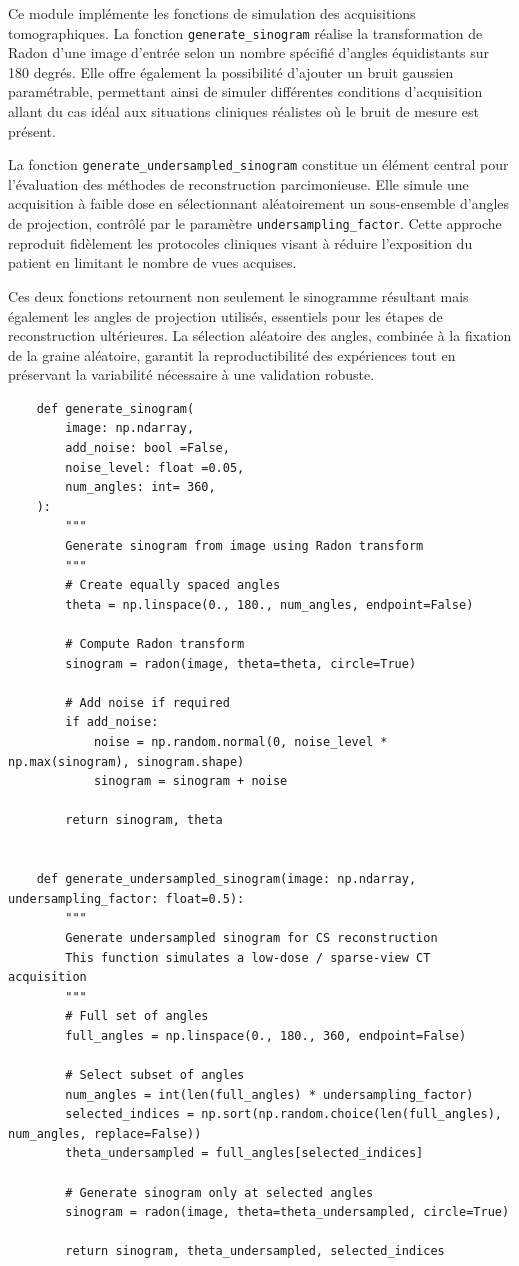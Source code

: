Ce module implémente les fonctions de simulation des acquisitions tomographiques. La fonction \texttt{generate\_sinogram} réalise la transformation de Radon d'une image d'entrée selon un nombre spécifié d'angles équidistants sur 180 degrés. Elle offre également la possibilité d'ajouter un bruit gaussien paramétrable, permettant ainsi de simuler différentes conditions d'acquisition allant du cas idéal aux situations cliniques réalistes où le bruit de mesure est présent.

La fonction \texttt{generate\_undersampled\_sinogram} constitue un élément central pour l'évaluation des méthodes de reconstruction parcimonieuse. Elle simule une acquisition à faible dose en sélectionnant aléatoirement un sous-ensemble d'angles de projection, contrôlé par le paramètre \texttt{undersampling\_factor}. Cette approche reproduit fidèlement les protocoles cliniques visant à réduire l'exposition du patient en limitant le nombre de vues acquises.

Ces deux fonctions retournent non seulement le sinogramme résultant mais également les angles de projection utilisés, essentiels pour les étapes de reconstruction ultérieures. La sélection aléatoire des angles, combinée à la fixation de la graine aléatoire, garantit la reproductibilité des expériences tout en préservant la variabilité nécessaire à une validation robuste.

\begin{verbatim}
    def generate_sinogram(
        image: np.ndarray,
        add_noise: bool =False,
        noise_level: float =0.05,
        num_angles: int= 360,
    ):
        """
        Generate sinogram from image using Radon transform
        """
        # Create equally spaced angles
        theta = np.linspace(0., 180., num_angles, endpoint=False)

        # Compute Radon transform
        sinogram = radon(image, theta=theta, circle=True)

        # Add noise if required
        if add_noise:
            noise = np.random.normal(0, noise_level * np.max(sinogram), sinogram.shape)
            sinogram = sinogram + noise

        return sinogram, theta


    def generate_undersampled_sinogram(image: np.ndarray, undersampling_factor: float=0.5):
        """
        Generate undersampled sinogram for CS reconstruction
        This function simulates a low-dose / sparse-view CT acquisition
        """
        # Full set of angles
        full_angles = np.linspace(0., 180., 360, endpoint=False)

        # Select subset of angles
        num_angles = int(len(full_angles) * undersampling_factor)
        selected_indices = np.sort(np.random.choice(len(full_angles), num_angles, replace=False))
        theta_undersampled = full_angles[selected_indices]

        # Generate sinogram only at selected angles
        sinogram = radon(image, theta=theta_undersampled, circle=True)

        return sinogram, theta_undersampled, selected_indices
\end{verbatim}

